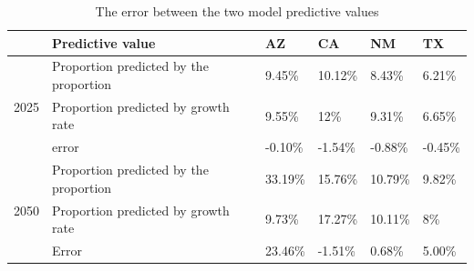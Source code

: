 \documentclass{mcmthesis}
\begin{document}
\begin{table}[h]
	\centering
	\caption{The error between the two model predictive values}
	\label{error}
	\begin{tabular}{|l|l|l|l|l|l|}
		\hline
		& Predictive value                & AZ      & CA      & NM      & TX      \\ \hline
		\multirow{3}{*}{2025} & Proportion predicted by the proportion & 9.45\%  & 10.12\% & 8.43\%  & 6.21\%  \\ \cline{2-6} 
		& Proportion predicted by growth rate& 9.55\%  & 12\%    & 9.31\%  & 6.65\%  \\ \cline{2-6} 
		& error                           & -0.10\% & -1.54\% & -0.88\% & -0.45\% \\ \hline
		\multirow{3}{*}{2050} & Proportion predicted by the proportion  & 33.19\% & 15.76\% & 10.79\% & 9.82\%  \\ \cline{2-6} 
		& Proportion predicted by growth rate& 9.73\%  & 17.27\% & 10.11\% & 8\%     \\ \cline{2-6} 
		& Error                           & 23.46\% & -1.51\% & 0.68\%  & 5.00\%  \\ \hline
	\end{tabular}
\end{table}
\end{document}
